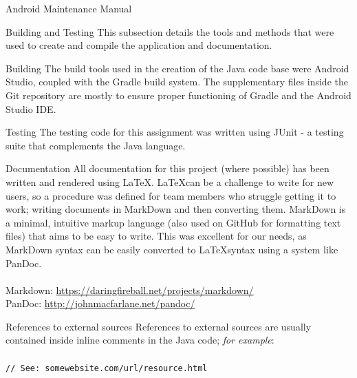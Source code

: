 \documentclass{article}
\begin{document}
\begin{section}{Android Maintenance Manual}
	\begin{subsection}{Building and Testing}
		This subsection details the tools and methods that were used to create and compile the application and documentation.
		
		\begin{subsubsection}{Building}
			The build tools used in the creation of the Java code base were Android Studio, coupled with the Gradle build system. The supplementary files inside the Git repository are mostly to ensure proper functioning of Gradle and the Android Studio IDE.
		\end{subsubsection}
		
		\begin{subsubsection}{Testing}
			The testing code for this assignment was written using JUnit - a testing suite that complements the Java language.
		\end{subsubsection}
		
		\begin{subsubsection}{Documentation}
			All documentation for this project (where possible) has been written and rendered using \LaTeX. \LaTeX can be a challenge to write for new users, so a procedure was defined for team members who struggle getting it to work; writing documents in MarkDown and then converting them. MarkDown is a minimal, intuitive markup language (also used on GitHub for formatting text files) that aims to be easy to write. This was excellent for our needs, as MarkDown syntax can be easily converted to \LaTeX syntax using a system like PanDoc. \\ \\
			Markdown: \url{https://daringfireball.net/projects/markdown/} \\
			PanDoc: \url{http://johnmacfarlane.net/pandoc/}
		\end{subsubsection}
		
		\begin{subsubsection}{References to external sources}
			References to external sources are usually contained inside inline comments in the Java code; {\em for example}: \\ \\
			{\tt // See: somewebsite.com/url/resource.html}
		\end{subsubsection}
	\end{subsection}
	\end{section}
	
\end{document}
